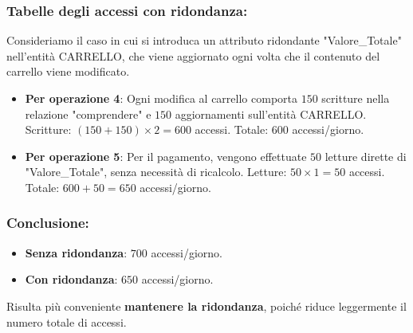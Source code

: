 \documentclass[a4paper,12pt]{report}
\begin{document}
	\subsubsection{Tabelle degli accessi con ridondanza:}
	Consideriamo il caso in cui si introduca un attributo ridondante "Valore\_Totale" nell'entità CARRELLO, che viene aggiornato ogni volta che il contenuto del carrello viene modificato.
	
	\begin{itemize}
		\item \textbf{Per operazione 4}: Ogni modifica al carrello comporta $150$ scritture nella relazione "comprendere" e $150$ aggiornamenti sull'entità CARRELLO. Scritture: $(150 + 150) \times 2 = 600$ accessi. Totale: $600$ accessi/giorno.
		\item \textbf{Per operazione 5}: Per il pagamento, vengono effettuate $50$ letture dirette di "Valore\_Totale", senza necessità di ricalcolo. Letture: $50 \times 1 = 50$ accessi. Totale: $600 + 50 = 650$ accessi/giorno.
	\end{itemize}
	
	\subsubsection{Conclusione:}
	\begin{itemize}
		\item \textbf{Senza ridondanza}: $700$ accessi/giorno.
		\item \textbf{Con ridondanza}: $650$ accessi/giorno.
	\end{itemize}
	Risulta più conveniente \textbf{mantenere la ridondanza}, poiché riduce leggermente il numero totale di accessi.
	
\end{document}
